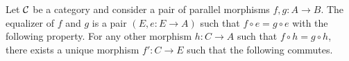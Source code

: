     \begin{definition}
        Let $\mathcal{C}$ be a category and consider a pair of parallel morphisms 
        $f, g: A \to B$. The equalizer of $f$ and $g$ is a pair 
        $(E, e: E \to A)$ such that $f \circ e = g \circ e$ with the 
        following property.
        For any other morphism $h: C \to A$ such that $f \circ h = g \circ h$,
        there exists a unique morphism $f': C \to E$ such that the
        following commutes.
        \begin{center}
        \end{center}
    \end{definition}

